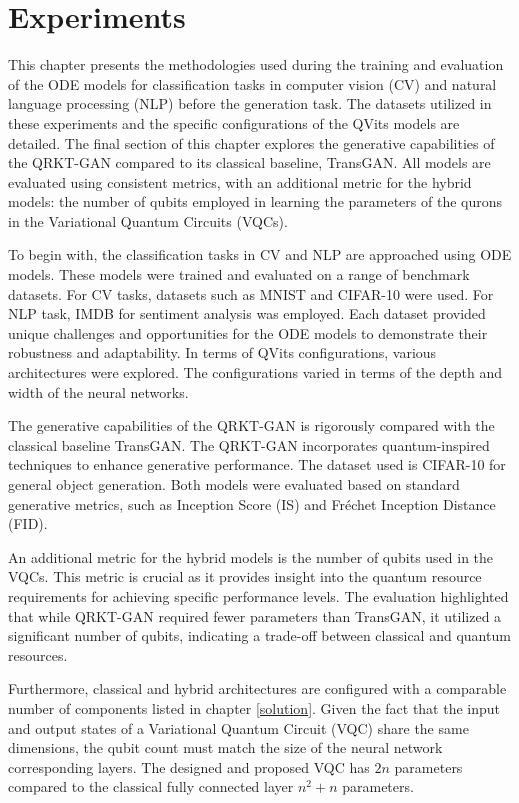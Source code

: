 \documentclass[12pt,a4paper]{report}
\begin{document}
\chapter{Experiments}\vspace{-12pt}
This chapter presents the methodologies used during the training and evaluation of the ODE models for classification tasks in computer vision (CV) and natural language processing (NLP) before the generation task. The datasets utilized in these experiments and the specific configurations of the QVits models are detailed. The final section of this chapter explores the generative capabilities of the QRKT-GAN compared to its classical baseline, TransGAN. All models are evaluated using consistent metrics, with an additional metric for the hybrid models: the number of qubits employed in learning the parameters of the qurons in the Variational Quantum Circuits (VQCs).

To begin with, the classification tasks in CV and NLP are approached using ODE models. These models were trained and evaluated on a range of benchmark datasets. For CV tasks, datasets such as MNIST and CIFAR-10 were used. For NLP task, IMDB for sentiment analysis was employed. Each dataset provided unique challenges and opportunities for the ODE models to demonstrate their robustness and adaptability. In terms of QVits configurations, various architectures were explored. The configurations varied in terms of the depth and width of the neural networks.

The generative capabilities of the QRKT-GAN is rigorously compared with the classical baseline TransGAN. The QRKT-GAN incorporates quantum-inspired techniques to enhance generative performance. The dataset used is CIFAR-10 for general object generation. Both models were evaluated based on standard generative metrics, such as Inception Score (IS) and Fréchet Inception Distance (FID).

An additional metric for the hybrid models is the number of qubits used in the VQCs. This metric is crucial as it provides insight into the quantum resource requirements for achieving specific performance levels. The evaluation highlighted that while QRKT-GAN required fewer parameters than TransGAN, it utilized a significant number of qubits, indicating a trade-off between classical and quantum resources.

Furthermore, classical and hybrid architectures are configured with a comparable number of components listed in chapter \ref{solution}. Given the fact that the input and output states of a Variational Quantum Circuit (VQC) share the same dimensions, the qubit count must match the size of the neural network corresponding layers. The designed and proposed VQC has $2n$ parameters compared to the classical fully connected layer $n^2 + n$ parameters.
\end{document}

